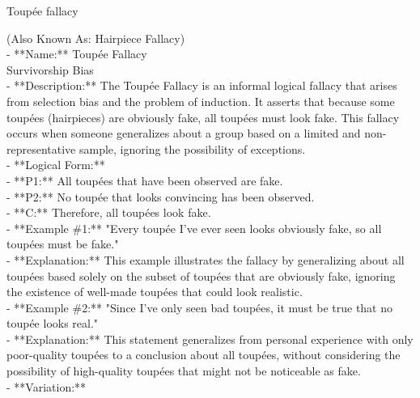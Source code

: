 \documentclass[a4paper,12pt,single,pdftex]{scrbook}
\begin{document}
Toupée fallacy
    
      (Also Known As: Hairpiece Fallacy)
    \\

  
    
      - **Name:** Toupée Fallacy
    \\

    
       Survivorship Bias
    \\

    
      - **Description:** The Toupée Fallacy is an informal logical fallacy that arises from selection bias and the problem of induction. It asserts that because some toupées (hairpieces) are obviously fake, all toupées must look fake. This fallacy occurs when someone generalizes about a group based on a limited and non-representative sample, ignoring the possibility of exceptions.
    \\

    
      - **Logical Form:**
    \\

    
        - **P1:** All toupées that have been observed are fake.
    \\

    
        - **P2:** No toupée that looks convincing has been observed.
    \\

    
        - **C:** Therefore, all toupées look fake.
    \\

    
      - **Example \#1:** "Every toupée I've ever seen looks obviously fake, so all toupées must be fake."
    \\

    
      - **Explanation:** This example illustrates the fallacy by generalizing about all toupées based solely on the subset of toupées that are obviously fake, ignoring the existence of well-made toupées that could look realistic.
    \\

    
      - **Example \#2:** "Since I've only seen bad toupées, it must be true that no toupée looks real."
    \\

    
      - **Explanation:** This statement generalizes from personal experience with only poor-quality toupées to a conclusion about all toupées, without considering the possibility of high-quality toupées that might not be noticeable as fake.
    \\

    
      - **Variation:**
    \\
\end{document}

